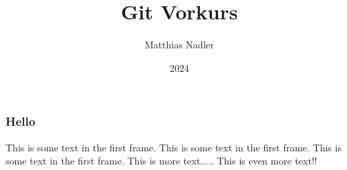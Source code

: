 \documentclass{beamer}
\title{Git Vorkurs}
\author{Matthias Nadler}
\institute{Uni Basel}
\date{2024}
\begin{document}
\frame{\titlepage}

\begin{frame}
\frametitle{Hello}
This is some text in the first frame. This is some text in the first frame. This is some text in the first frame.
This is more text.....
This is even more text!!
\end{frame}
\end{document}
